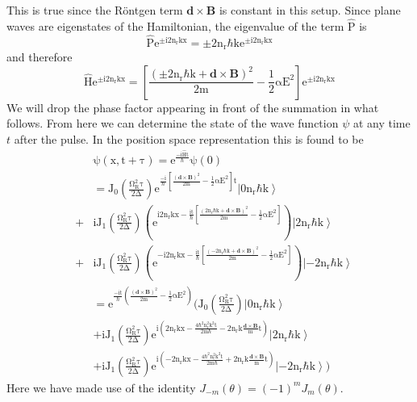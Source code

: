 \documentclass[twocolumn,english,pra,aps,superscriptaddress,floatfix]{revtex4-1}
\begin{document}
This is true since the R\"{o}ntgen term $\mathbf{d}\times\mathbf{B}$ is constant in this setup.  Since plane waves are eigenstates of the Hamiltonian, the eigenvalue of the term $\mathrm{\hat{P}}$ is
\begin{equation}
\mathrm{\hat{P} e^{\pm i2n_rkx}=\pm2n_r\hbar k e^{\pm i2n_rkx}}
\end{equation}
and therefore
\begin{equation}
\mathrm{\hat{H} e^{\pm i2n_rkx}=\left[\frac{\left(\pm 2n_r\hbar k+\mathbf{d}\times\mathbf{B}\right)^2}{2m}-\frac{1}{2}\alpha E^2\right]e^{\pm i2n_rkx}}
\end{equation}
We will drop the phase factor appearing in front of the summation in what follows. From here we can determine the state of the wave function $\psi$ at any time $t$ after the pulse.  In the position space representation this is found to be 
\begin{eqnarray}
&&\mathrm{\psi(x,t+\tau)=e^{\frac{-i\hat{H}t}{\hbar}}\psi(0)} \nonumber \\
&&=\mathrm{J_0\left(\frac{\Omega_R^2\tau}{2\Delta}\right)e^{\frac{-i}{\hbar}\left[\frac{\left(\mathbf{d}\times\mathbf{B}\right)^2}{2m}-\frac{1}{2}\alpha E^2\right]t}\left|0n_r\hbar k\right>} \nonumber \\
&+&\mathrm{iJ_1\left(\frac{\Omega_R^2\tau}{2\Delta}\right)\left(e^{i2n_rkx-\frac{it}{\hbar}\left[\frac{\left( 2n_r\hbar k+\mathbf{d}\times\mathbf{B}\right)^2}{2m}-\frac{1}{2}\alpha E^2\right]}\right)\left|2n_r\hbar k\right>} \nonumber \\
&+&\mathrm{iJ_1\left(\frac{\Omega_R^2\tau}{2\Delta}\right)\left(e^{-i2n_rkx-\frac{it}{\hbar}\left[\frac{\left(-2n_r\hbar k+\mathbf{d}\times\mathbf{B}\right)^2}{2m}-\frac{1}{2}\alpha E^2\right]}\right)\left|-2n_r\hbar k\right>} \nonumber \\
&&=\mathrm{e^{\frac{-it}{\hbar}\left(\frac{\left(\mathbf{d}\times\mathbf{B}\right)^2}{2m}-\frac{1}{2}\alpha E^2\right)}\bigg(J_0\left(\frac{\Omega_R^2\tau}{2\Delta}\right)\left|0n_r\hbar k\right>}\nonumber \\
&&+\mathrm{iJ_1\left(\frac{\Omega_R^2\tau}{2\Delta}\right)e^{i\left(2n_rkx-\frac{4\hbar^2n_r^2k^2t}{2m\hbar}-2n_rk\frac{\mathbf{d}\times\mathbf{B}}{m}t\right)}\left|2n_r\hbar k\right>}\nonumber \\
&&+\mathrm{iJ_1\left(\frac{\Omega_R^2\tau}{2\Delta}\right)e^{i\left(-2n_rkx-\frac{4\hbar^2n_r^2k^2t}{2m\hbar}+2n_rk\frac{\mathbf{d}\times\mathbf{B}}{m}t\right)}\left|-2n_r\hbar k\right>\bigg)}
\end{eqnarray}
Here we have made use of the identity $J_{-m}(\theta)=(-1)^mJ_{m}(\theta)$.  
\end{document}
